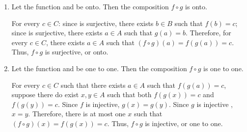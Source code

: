 \begin{exercise}{10}
  \begin{enumerate}
    \item Let the function  and  be onto.
          Then the composition $f \circ g$ is onto.

    \Proof{} For every $c \in C$: since  is surjective, there
    exists $b \in B$ such that $f(b) = c$; since  is surjective,
    there exists $a \in A$ such that $g(a) = b$. Therefore, for every $c \in C$,
    there exists $a \in A$ such that $(f \circ g)(a) = f(g(a)) = c$.
    Thus, $f \circ g$ is surjective, or onto. \QED

    \item Let the function  and  be one to one.
          Then the composition $f \circ g$ is one to one.

    \Proof{} For every $c \in C$ such that there exists $a \in A$ such that
    $f(g(a)) = c$, suppose there do exist $x, y \in A$ such that both $f(g(x)) = c$
    and $f(g(y)) = c$. Since $f$ is injective, $g(x) = g(y)$. Since $g$ is injective
    , $x = y$. Therefore, there is at most one $x$ such that $(f \circ g)(x) =
    f(g(x)) = c$. Thus, $f \circ g$ is injective, or one to one. \QED
  \end{enumerate}
\end{exercise}

